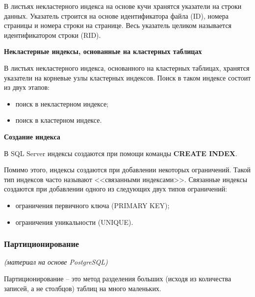 В листьях некластерного индекса на основе кучи хранятся указатели на строки данных. Указатель строится на основе идентификатора файла (ID), номера страницы и номера строки на странице. Весь указатель целиком называется идентификатором строки (RID).

\textbf{Некластерные индексы, основанные на кластерных таблицах}

В листьях некластерного индекса, основанного на кластерных таблицах, хранятся указатели на корневые узлы кластерных индексов. Поиск в таком индексе состоит из двух этапов:

\begin{itemize}
	\item поиск в некластерном индексе;
	\item поиск в кластерном индексе.
\end{itemize}

\textbf{Создание индекса}

В SQL Server индексы создаются при помощи команды \textbf{CREATE INDEX}.

Помимо этого, индексы создаются при добавлении некоторых ограничений. Такой тип индексов часто называют <<связанными индексами>>. Связанные индексы создаются при добавлении одного из следующих двух типов ограничений: 
\begin{itemize}
	\item ограничения первичного ключа (PRIMARY KEY); 
	\item ограничения уникальности (UNIQUE). 
\end{itemize}

\subsubsection{Партиционирование}
\textit{(материал на основе PostgreSQL)}

Партиционирование – это метод разделения больших (исходя из количества записей, а не столбцов) таблиц на много маленьких.

